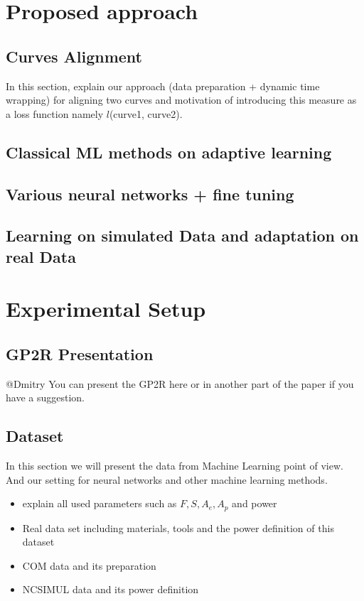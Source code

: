 \documentclass{article}
\begin{document}
\section{Proposed approach}
\subsection{Curves Alignment}
In this section, explain our approach (data preparation + dynamic time wrapping) for aligning two curves and motivation of introducing this measure as a loss function namely $l$(curve1, curve2). 
\subsection{Classical ML methods on adaptive learning}
\subsection{Various neural networks + fine tuning}
\subsection{Learning on simulated Data and adaptation on real Data}
\section{Experimental Setup}
\subsection{GP2R Presentation}
@Dmitry You can present the GP2R here or in another part of the paper if you have a suggestion.
\subsection{Dataset}
In this section we will present the data from Machine Learning point of view. And our setting for neural networks and other machine learning methods.
\begin{itemize}
\item explain all used parameters such as $F, S, A_e, A_p$ and power 
\item Real data set including materials, tools and the power definition of this dataset
\item COM data and its preparation 
\item NCSIMUL data and its power definition
\end{itemize} 
\end{document}
